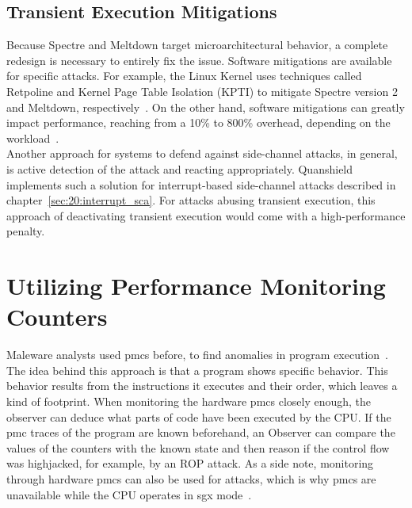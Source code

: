 \subsection{Transient Execution Mitigations}
\label{sec:20:def_sca}
Because Spectre and Meltdown target microarchitectural behavior, a complete
redesign is necessary to entirely fix the issue. Software mitigations are
available for specific attacks. For example, the Linux Kernel uses techniques
called Retpoline and Kernel Page Table Isolation (KPTI) to mitigate Spectre
version 2 and Meltdown, respectively~\cite{retpoline}. On the other hand,
software mitigations can greatly impact performance, reaching from a 10\% to
800\% overhead, depending on the workload~\cite{low2018overview}.\\

Another approach for systems to defend against side-channel attacks, in general,
is active detection of the attack and reacting appropriately. Quanshield
implements such a solution for interrupt-based side-channel attacks described in
chapter~\ref{sec:20:interrupt_sca}. For attacks abusing transient execution,
this approach of deactivating transient execution would come with a
high-performance penalty.\\

\section{Utilizing Performance Monitoring Counters}
\label{sec:20:pmc}
Maleware analysts used \glspl{pmc} before, to find anomalies in program
execution~\cite{xia2012cfimon, wang2016malicious}. The idea behind this approach
is that a program shows specific behavior. This behavior results from the
instructions it executes and their order, which leaves a kind of footprint. When
monitoring the hardware \glspl{pmc} closely enough, the observer can deduce what
parts of code have been executed by the CPU. If the \gls{pmc} traces of the
program are known beforehand, an Observer can compare the values of the counters
with the known state and then reason if the control flow was highjacked, for
example, by an ROP attack. As a side note, monitoring through hardware
\glspl{pmc} can also be used for attacks, which is why \glspl{pmc} are
unavailable while the CPU operates in \gls{sgx}
mode~\cite{uhsadel2008exploiting,costan2016intel}.\\

